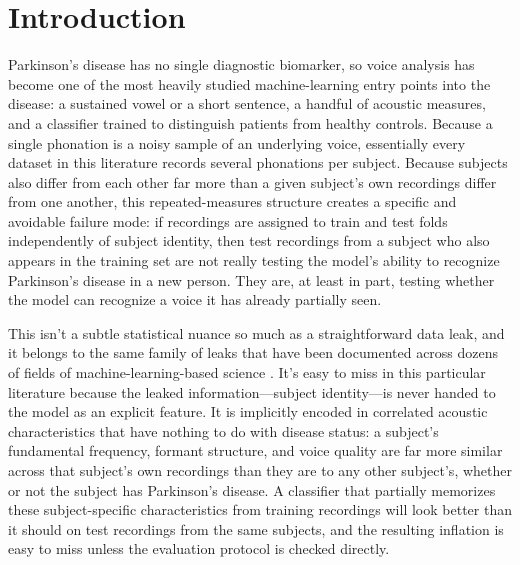 \documentclass[11pt]{article}
\begin{document}
\section{Introduction}
Parkinson's disease has no single diagnostic biomarker, so voice analysis has become one of the most heavily studied machine-learning entry points into the disease: a sustained vowel or a short sentence, a handful of acoustic measures, and a classifier trained to distinguish patients from healthy controls. Because a single phonation is a noisy sample of an underlying voice, essentially every dataset in this literature records several phonations per subject. Because subjects also differ from each other far more than a given subject's own recordings differ from one another, this repeated-measures structure creates a specific and avoidable failure mode: if recordings are assigned to train and test folds independently of subject identity, then test recordings from a subject who also appears in the training set are not really testing the model's ability to recognize Parkinson's disease in a new person. They are, at least in part, testing whether the model can recognize a voice it has already partially seen.

This isn't a subtle statistical nuance so much as a straightforward data leak, and it belongs to the same family of leaks that have been documented across dozens of fields of machine-learning-based science \cite{kapoor2023}. It's easy to miss in this particular literature because the leaked information---subject identity---is never handed to the model as an explicit feature. It is implicitly encoded in correlated acoustic characteristics that have nothing to do with disease status: a subject's fundamental frequency, formant structure, and voice quality are far more similar across that subject's own recordings than they are to any other subject's, whether or not the subject has Parkinson's disease. A classifier that partially memorizes these subject-specific characteristics from training recordings will look better than it should on test recordings from the same subjects, and the resulting inflation is easy to miss unless the evaluation protocol is checked directly.
\end{document}
